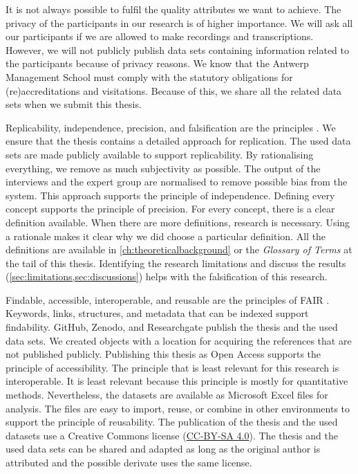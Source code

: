 It is not always possible to fulfil the quality attributes we want to achieve. The privacy of the participants in our research is of higher importance. We will ask all our participants if we are allowed to make recordings and transcriptions. However, we will not publicly publish data sets containing information related to the participants because of privacy reasons. We know that the Antwerp Management School must comply with the statutory obligations for (re)accreditations and visitations. Because of this, we share all the related data sets when we submit this thesis.

Replicability, independence, precision, and falsification are the principles \parencite[pp.~15--17]{Recker2012}. We ensure that the thesis contains a detailed approach for replication. The used data sets are made publicly available to support replicability. By rationalising everything, we remove as much subjectivity as possible. The output of the interviews and the expert group are normalised to remove possible bias from the system. This approach supports the principle of independence. Defining every concept supports the principle of precision. For every concept, there is a clear definition available. When there are more definitions, research is necessary. Using a rationale makes it clear why we did choose a particular definition. All the definitions are available in \cref{ch:theoreticalbackground} or the \textit{Glossary of Terms} at the tail of this thesis. Identifying the research limitations and discuss the results (\cref{sec:limitations,sec:discussions}) helps with the falsification of this research.

Findable, accessible, interoperable, and reusable are the principles of FAIR \parencite{Wilkinson2016}. Keywords, links, structures, and metadata that can be indexed support findability. GitHub, Zenodo, and Researchgate publish the thesis and the used data sets. We created objects with a location for acquiring the references that are not published publicly. Publishing this thesis as Open Access supports the principle of accessibility. The principle that is least relevant for this research is interoperable. It is least relevant because this principle is mostly for quantitative methods. Nevertheless, the datasets are available as Microsoft Excel files for analysis. The files are easy to import, reuse, or combine in other environments to support the principle of reusability. The publication of the thesis and the used datasets use a Creative Commons license (\href{https://creativecommons.org/licenses/by-sa/4.0/}{CC-BY-SA 4.0}). The thesis and the used data sets can be shared and adapted as long as the original author is attributed and the possible derivate uses the same license.


